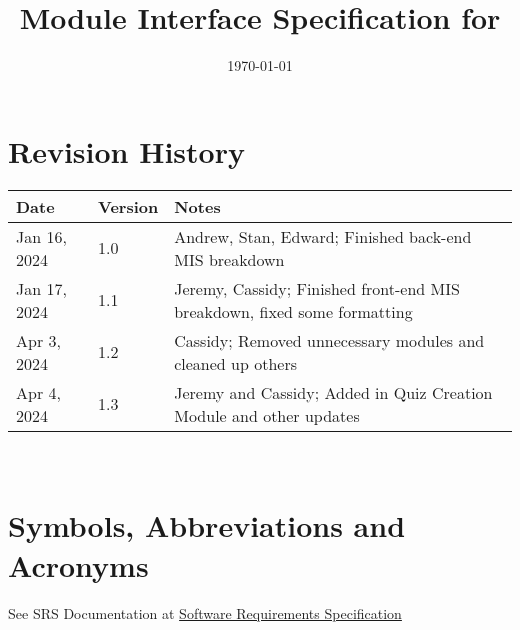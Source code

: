 \documentclass[12pt, titlepage]{article}
\begin{document}
\title{Module Interface Specification for \progname{}}

\author{\authname}

\date{\today}

\maketitle


\section{Revision History}

\begin{tabularx}{\textwidth}{p{3cm}p{2cm}X}
\toprule {\bf Date} & {\bf Version} & {\bf Notes}\\
\midrule
Jan 16, 2024 & 1.0 & Andrew, Stan, Edward; Finished back-end MIS breakdown\\
Jan 17, 2024 & 1.1 & Jeremy, Cassidy; Finished front-end MIS breakdown, fixed some formatting \\
Apr 3, 2024 & 1.2 & Cassidy; Removed unnecessary modules and cleaned up others \\
Apr 4, 2024 & 1.3 & Jeremy and Cassidy; Added in Quiz Creation Module and other updates \\
\bottomrule
\end{tabularx}

~\newpage

\section{Symbols, Abbreviations and Acronyms}

See SRS Documentation at \href{https://github.com/stanreee/sign-language-learning/blob/main/docs/SRS/SRS.pdf}{Software Requirements Specification} \\
\end{document}
